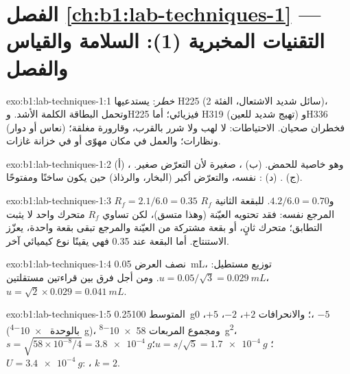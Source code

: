 \section*{الفصل \ref{ch:b1:lab-techniques-1} --- التقنيات المخبرية (1): السلامة والقياس والفصل}

\begin{solution}{exo:b1:lab-techniques-1:1}
\emph{خطر}: يستدعيها H225 (سائل شديد الاشتعال، الفئة 2)،
وتحمل البطاقة الكلمة الأشد. وH225  فيزيائي؛ أما H319
(تهيج شديد للعين) وH336 (نعاس أو دوار) فخطران
صحيان. الاحتياطات: لا لهب ولا شرر بالقرب، وقارورة مغلقة؛ ونظارات؛
والعمل في مكان مهوّى أو في خزانة غازات.
\end{solution}

\begin{solution}{exo:b1:lab-techniques-1:2}
(أ) ، وهو خاصية للحمض. (ب) ، صغيرة لأن
التعرّض صغير. (ج) . (د) :  نفسه، والتعرّض أكبر
(البخار، والرذاذ) حين يكون ساخنًا ومفتوحًا.
\end{solution}

\begin{solution}{exo:b1:lab-techniques-1:3}
$R_f = 2.1/6.0 = 0.35$ و$4.2/6.0 = 0.70$. للبقعة الثانية $R_f$
المرجع نفسه: فقد تحتويه العيّنة (وهذا متسق)، لكن
تساوي $R_f$  متحرك واحد لا يثبت التطابق؛  متحرك ثانٍ، أو
بقعة مشتركة من العيّنة والمرجع تبقى بقعة واحدة، يعزّز
الاستنتاج. أما البقعة عند 0.35 فهي يقينًا نوع كيميائي آخر.
\end{solution}

\begin{solution}{exo:b1:lab-techniques-1:4}
نصف العرض \qty{0.05}{mL}، توزيع مستطيل: $u = 0.05/\sqrt3 = \qty{0.029}{mL}$.
ومن أجل فرق بين قراءتين مستقلتين،
$u = \sqrt{2} \times 0.029 = \qty{0.041}{mL}$.
\end{solution}

\begin{solution}{exo:b1:lab-techniques-1:5}
المتوسط \qty{0.25100}{g}؛ والانحرافات $+2$، $-2$، $+5$، 0، $-5$ (بالوحدة
\qty{e-4}{g})، ومجموع المربعات \qty{58e-8}{g^2}، $s = \sqrt{58 \times
10^{-8}/4} = \qty{3.8e-4}{g}$؛ $u = s/\sqrt5 = \qty{1.7e-4}{g}$؛
$U = \qty{3.4e-4}{g}$: ، $k = 2$.
\end{solution}

